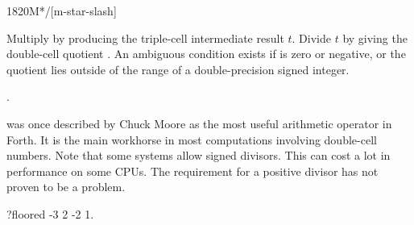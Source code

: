 \begin{worddef}{1820}{M*/}[m-star-slash]
\item {}

	Multiply  by  producing the triple-cell
	intermediate result $t$. Divide $t$ by  giving the
	double-cell quotient . An ambiguous condition exists
	if  is zero or negative, or the quotient lies outside
	of the range of a double-precision signed integer.

\see {}.

	\begin{rationale} %
		 was once described by Chuck Moore as the most
		useful arithmetic operator in Forth. It is the main workhorse
		in most computations involving double-cell numbers. Note that
		some systems allow signed divisors. This can cost a lot in
		performance on some CPUs. The requirement for a positive
		divisor has not proven to be a problem.
	\end{rationale}

	\begin{testing}\ttfamily

		\word{:} ?floored \word{[} -3 2 \word{/} -2 \word{=} \word{]}   1.\   \word{;}

		\small 
		 \\
		 \\ %
		 \\ %
		 \\
		 \\
		 \\ %
		 \\


\end{testing}
\end{worddef}
